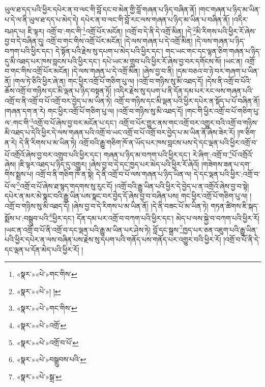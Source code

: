 ཡུལ་ཐ་དད་པའི་ཕྱིར་དཔེར་ན་བ་ལང་གི་བློ་དང་བ་མེན་གྱི་བློ་གཞན་པ་ཉིད་བཞིན་ནོ། །གང་གཞན་པ་ཉིད་མ་ཡིན་པ་དེ་ལ་ནི་ཡུལ་ཐ་དད་པ་མེད་དེ། དཔེར་ན་བ་ལང་གི་བློ་རང་ལས་གཞན་པ་ཉིད་མ་ཡིན་པ་བཞིན་ནོ། །འདིར་བཤད་པ། ཇི་ལྟར། འགྲོ་བ་:གང་གི་\footnote{«སྣར་»«པེ་»གང་གིས་}འགྲོ་པོར་མངོན། །འགྲོ་བ་དེ་ནི་དེ་འགྲོ་མིན། །དེ་\footnote{«སྣར་»«པེ་»། །}མི་རིགས་པའི་ཕྱིར་རོ་ཞེས་བྱ་བ་དེ་བཞིན་དུ། འགྲོ་བ་གང་གིས་འགྲོ་པོར་མངོན། །དེ་ལས་གཞན་པ་དེ་འགྲོ་མིན། །དེ་ལས་གཞན་པ་ཉིད་བཀག་པའི་ཕྱིར་དང་། དེ་སྟོན་པའི་རྗེས་སུ་དཔག་པ་མེད་པའི་ཕྱིར་དང་། གང་ཡང་གང་དང་ལྷན་ཅིག་གཞན་པ་ཉིད་དུ་མི་འཐད་པར་ཁས་བླངས་པའི་ཕྱིར་དང་། དཔེ་ཡང་མ་གྲུབ་པའི་ཕྱིར་རོ་ཞེས་བྱ་བར་དགོངས་སོ། །ཡང་ན། འགྲོ་བ་གང་གིས་འགྲོ་པོར་མངོན། །དེ་ལས་གཞན་པ་དེ་འགྲོ་མིན། །ཞེས་བྱ་བ་ནི། །དམ་བཅའ་བ་ཉེ་བར་གཞག་པ་ཡིན་ནོ། །གལ་ཏེ་ཅིའི་ཕྱིར་ཞེ་ན། གང་ཕྱིར་འགྲོ་པོ་གཅིག་པུ་ལ། །འགྲོ་བ་གཉིས་སུ་མི་འཐད་དོ། །དེས་ནི་འགྲོ་བ་པོའི་ཆོས་འགྲོ་བ་གཉིས་དང་མི་ལྡན་པ་ཉིད་བསྟན་ཏོ། །འདིར་རྗེས་སུ་དཔག་པ་ནི་དོན་དམ་པར་རང་ལས་གཞན་པའི་འགྲོ་བ་ནི་འགྲོ་བ་པོ་འགྲོ་བར་བྱེད་པ་མ་ཡིན་ཏེ། འགྲོ་བ་གཉིས་དང་མི་ལྡན་པའི་ཕྱིར་དཔེར་ན་སྡོད་པ་པོ་བཞིན་ནོ། །གཞན་དག་ན་རེ། གང་ཕྱིར་འགྲོ་པོ་གཅིག་པུ་ལ། །འགྲོ་བ་གཉིས་སུ་མི་འཐད་དོ། །གང་གི་ཕྱིར་འགྲོ་བ་པོ་གཅིག་པུ་ལ་:གང་གི་\footnote{«སྣར་»«པེ་»གང་གིས་}འགྲོ་བ་པོ་ཞེས་བྱ་བར་མངོན་པ་དང་། འགྲོ་བ་པོར་གྱུར་ནས་གང་འགྲོ་བར་འགྱུར་བའི་འགྲོ་བ་གཉིས་མི་འཐད་པ་དེའི་ཕྱིར་དེ་ལས་གཞན་པའི་འགྲོ་བ་ཡང་འགྲོ་བ་པོ་འགྲོ་བར་བྱེད་པ་མ་ཡིན་ནོ་ཞེས་ཟེར་རོ། །ཁ་ཅིག་ན་རེ། དེ་ནི་རིགས་པ་མ་ཡིན་ཏེ། འགྲོ་བའི་རྒྱུ་གཅིག་ཁོ་ན་ཡོད་པར་ཁས་བླངས་པས་དེ་དང་ལྡན་པའི་ཕྱིར་འགྲོ་བ་པོ་འགྲོའོ་ཞེས་བྱ་བར་འགྲུབ་པའི་ཕྱིར་དང་། གཞན་པ་ཉིད་མ་བཀག་པའི་ཕྱིར་དང་། རེ་ཞིག་:འགྲོ་བ་\footnote{«སྣར་»«པེ་»འགྲོ་}པོ་འགྲོའོ་ཞེས། །ཇི་ལྟར་འཐད་པ་ཉིད་དུ་འགྱུར། །ཞེས་བྱ་བ་དེ་དང་ཁྱད་པར་མེད་པའི་ཕྱིར་རོ་ཞེའོ། །གཟེགས་ཟན་པ་དག་གིས་སྨྲས་པ། འགྲོ་བ་ནི་གཅིག་ཁོ་ན་སྟེ། དེ་ནི་འགྲོ་བ་པོ་ལས་གཞན་པ་ཉིད་ཡིན་ལ། དེ་དང་ལྡན་པའི་ཕྱིར་:འགྲོ་བ་པོ་ལ་\footnote{«སྣར་»«པེ་»འགྲོ་བ་པོ་}འགྲོ་བ་པོ་ཞེས་ཐ་སྙད་གདགས་སུ་རུང་ངོ། །འགྲོ་བའི་རྒྱུ་ཡིན་པའི་ཕྱིར་དེ་བྱེད་པ་ན་འགྲོའོ་ཞེས་བྱ་བ་སྟེ། དཔེར་ན་མར་མེ་སྣང་བའི་རྒྱུ་ཡིན་པས་སྣང་བར་བྱེད་དོ་ཞེས་བྱ་བ་བཞིན་པས། གང་ཕྱིར་འགྲོ་པོ་གཅིག་པུ་ལ། །འགྲོ་བ་གཉིས་སུ་མི་འཐད་དོ། །ཞེས་བྱ་བ་དེ་རིགས་པ་མ་ཡིན་ནོ། །དེ་ནི་བཟང་པོ་མ་ཡིན་ཏེ། གཏན་ཚིགས་ཇི་སྐད་སྨོས་པ་:བསྒྲུབ་པའི་\footnote{«སྣར་»«པེ་»བསྒྲུབས་པའི་}ཕྱིར་དང་། དོན་དམ་པར་འགྲོ་བ་བཀག་པའི་ཕྱིར་དང་། མེད་པ་ལས་སྐྱེ་བ་བཀག་པའི་ཕྱིར་རོ། །ཡང་ན་འགྲོ་བ་པོ་ནི་འགྲོ་བ་དང་ལྡན་པའི་རྒྱུ་མ་ཡིན་པར་ཤེས་ཏེ། བློ་དང་སྒྲས་\footnote{«སྣར་»«པེ་»སྒྲ་}ཁྱད་པར་ཅན་འཇུག་པའི་རྒྱུ་ཡིན་པའི་ཕྱིར་དཔེར་ན་ལས་བཞིན་པས་རྗེས་སུ་དཔག་པའི་གནོད་པས་གནོད་པར་འགྱུར་བའི་ཕྱིར་རོ། །འགྲོ་བ་པོ་ནི་དེ་དང་ལྡན་པ་དོན་མེད་པའི་ཕྱིར་རོ། །

